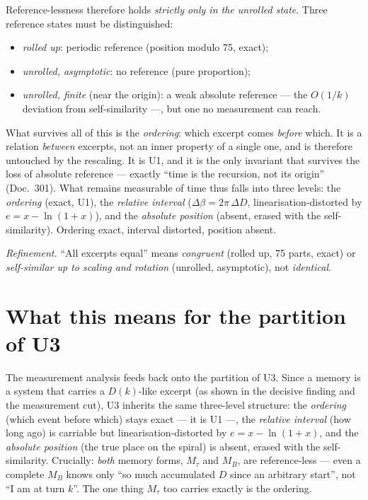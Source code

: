 Reference-lessness therefore holds \emph{strictly only in the unrolled state}. Three
reference states must be distinguished:
\begin{itemize}
\item \emph{rolled up}: periodic reference (position modulo 75, exact);
\item \emph{unrolled, asymptotic}: no reference (pure proportion);
\item \emph{unrolled, finite} (near the origin): a weak absolute reference --- the $O(1/k)$
deviation from self-similarity ---, but one no measurement can reach.
\end{itemize}

What survives all of this is the \emph{ordering}: which excerpt comes \emph{before} which. It
is a relation \emph{between} excerpts, not an inner property of a single one, and is
therefore untouched by the rescaling. It is U1, and it is the only invariant that survives
the loss of absolute reference --- exactly \enquote{time is the recursion, not its origin}
(Doc.~301). What remains measurable of time thus falls into three levels: the \emph{ordering}
(exact, U1), the \emph{relative interval} ($\Delta\beta=2\pi\,\Delta D$, linearisation-distorted
by $e=x-\ln(1+x)$), and the \emph{absolute position} (absent, erased with the self-similarity).
Ordering exact, interval distorted, position absent.

\emph{Refinement.} \enquote{All excerpts equal} means \emph{congruent} (rolled up, 75 parts,
exact) or \emph{self-similar up to scaling and rotation} (unrolled, asymptotic), not
\emph{identical}.

\section{What this means for the partition of U3}

The measurement analysis feeds back onto the partition of U3. Since a memory is a system that
carries a $D(k)$-like excerpt (as shown in the decisive finding and the measurement cut), U3
inherits the same three-level structure: the \emph{ordering} (which event before which)
stays exact --- it is U1 ---, the \emph{relative interval} (how long ago) is carriable but
linearisation-distorted by $e=x-\ln(1+x)$, and the \emph{absolute position} (the true place
on the spiral) is absent, erased with the self-similarity. Crucially: \emph{both} memory
forms, $M_\tau$ and $M_B$, are reference-less --- even a complete $M_B$ knows only \enquote{so
much accumulated $D$ since an arbitrary start}, not \enquote{I am at turn $k$}. The one thing
$M_\tau$ too carries exactly is the ordering.

